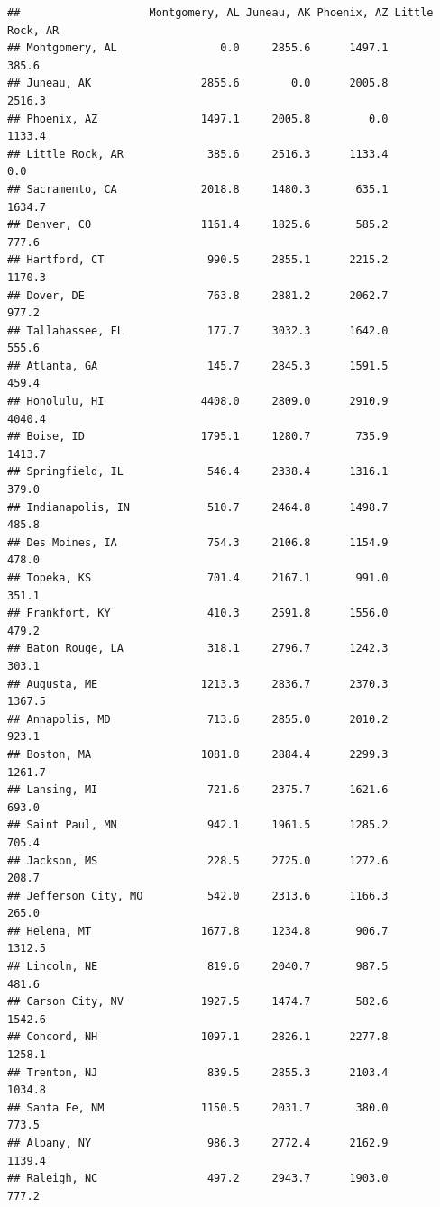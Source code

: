 \documentclass[
]{article}
\begin{document}
\begin{verbatim}
##                    Montgomery, AL Juneau, AK Phoenix, AZ Little Rock, AR
## Montgomery, AL                0.0     2855.6      1497.1           385.6
## Juneau, AK                 2855.6        0.0      2005.8          2516.3
## Phoenix, AZ                1497.1     2005.8         0.0          1133.4
## Little Rock, AR             385.6     2516.3      1133.4             0.0
## Sacramento, CA             2018.8     1480.3       635.1          1634.7
## Denver, CO                 1161.4     1825.6       585.2           777.6
## Hartford, CT                990.5     2855.1      2215.2          1170.3
## Dover, DE                   763.8     2881.2      2062.7           977.2
## Tallahassee, FL             177.7     3032.3      1642.0           555.6
## Atlanta, GA                 145.7     2845.3      1591.5           459.4
## Honolulu, HI               4408.0     2809.0      2910.9          4040.4
## Boise, ID                  1795.1     1280.7       735.9          1413.7
## Springfield, IL             546.4     2338.4      1316.1           379.0
## Indianapolis, IN            510.7     2464.8      1498.7           485.8
## Des Moines, IA              754.3     2106.8      1154.9           478.0
## Topeka, KS                  701.4     2167.1       991.0           351.1
## Frankfort, KY               410.3     2591.8      1556.0           479.2
## Baton Rouge, LA             318.1     2796.7      1242.3           303.1
## Augusta, ME                1213.3     2836.7      2370.3          1367.5
## Annapolis, MD               713.6     2855.0      2010.2           923.1
## Boston, MA                 1081.8     2884.4      2299.3          1261.7
## Lansing, MI                 721.6     2375.7      1621.6           693.0
## Saint Paul, MN              942.1     1961.5      1285.2           705.4
## Jackson, MS                 228.5     2725.0      1272.6           208.7
## Jefferson City, MO          542.0     2313.6      1166.3           265.0
## Helena, MT                 1677.8     1234.8       906.7          1312.5
## Lincoln, NE                 819.6     2040.7       987.5           481.6
## Carson City, NV            1927.5     1474.7       582.6          1542.6
## Concord, NH                1097.1     2826.1      2277.8          1258.1
## Trenton, NJ                 839.5     2855.3      2103.4          1034.8
## Santa Fe, NM               1150.5     2031.7       380.0           773.5
## Albany, NY                  986.3     2772.4      2162.9          1139.4
## Raleigh, NC                 497.2     2943.7      1903.0           777.2

\end{verbatim}
\end{document}
